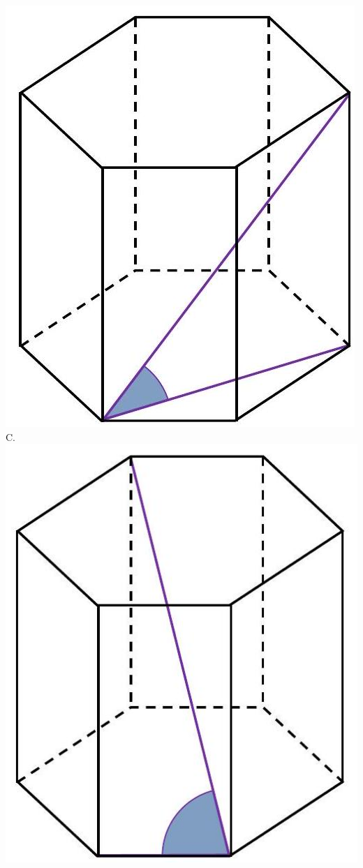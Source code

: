\documentclass[10pt]{article}
\begin{document}
\includegraphics[max width=\textwidth, center]{2024_11_21_daeb5e5efb43dd4cb535g-23(3)}\\
C.\\
\includegraphics[max width=\textwidth, center]{2024_11_21_daeb5e5efb43dd4cb535g-23(1)}\\
\end{document}
